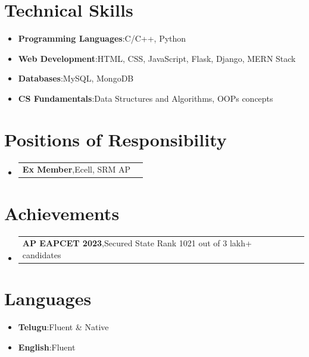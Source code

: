 \documentclass[a4paper,10pt]{article} %
\makeatletter
\newcommand{\resumeItem}[2]{
  \item{
    \textbf{#1}{:\hspace{0.5mm}#2 \vspace{-1mm}}
  }
}
\newcommand{\resumePOR}[3]{
\vspace{0.3mm}\item
    \begin{tabular*}{0.97\textwidth}[t]{l@{\extracolsep{\fill}}r}
        \textbf{#1},\hspace{0.3mm}#2 & \textit{\small{#3}}
    \end{tabular*}
    \vspace{-3mm}
}
\newcommand{\resumeSubItem}[2]{\resumeItem{#1}{#2}\vspace{-3pt}}
\newcommand{\resumeSubHeadingListStart}{\begin{itemize}[leftmargin=*,labelsep=0mm,itemsep=1pt]}
\newcommand{\resumeHeadingSkillStart}{\begin{itemize}[leftmargin=*,itemsep=1mm, rightmargin=2ex]}
\newcommand{\resumeSubHeadingListEnd}{\end{itemize}\vspace{1mm}}
\newcommand{\resumeHeadingSkillEnd}{\end{itemize}\vspace{-1mm}}
\makeatother
\begin{document}
\section{Technical Skills}
 \resumeHeadingSkillStart
  \resumeSubItem{Programming Languages}{C/C++, Python}
  \resumeSubItem{Web Development}{HTML, CSS, JavaScript, Flask, Django, MERN Stack}
  \resumeSubItem{Databases}{MySQL, MongoDB}
  \resumeSubItem{CS Fundamentals}{Data Structures and Algorithms, OOPs concepts}
 \resumeHeadingSkillEnd

\section{Positions of Responsibility}
\resumeSubHeadingListStart
\resumePOR{Ex Member}{Ecell, SRM AP}{}
\resumeSubHeadingListEnd

\section{Achievements}
\resumeSubHeadingListStart
\resumePOR{AP EAPCET 2023}{Secured State Rank 1021 out of 3 lakh+ candidates}{}
\resumeSubHeadingListEnd

\section{Languages}
\resumeHeadingSkillStart
    \resumeSubItem{Telugu}{Fluent \& Native}
    \resumeSubItem{English}{Fluent}
\resumeHeadingSkillEnd
\end{document}

